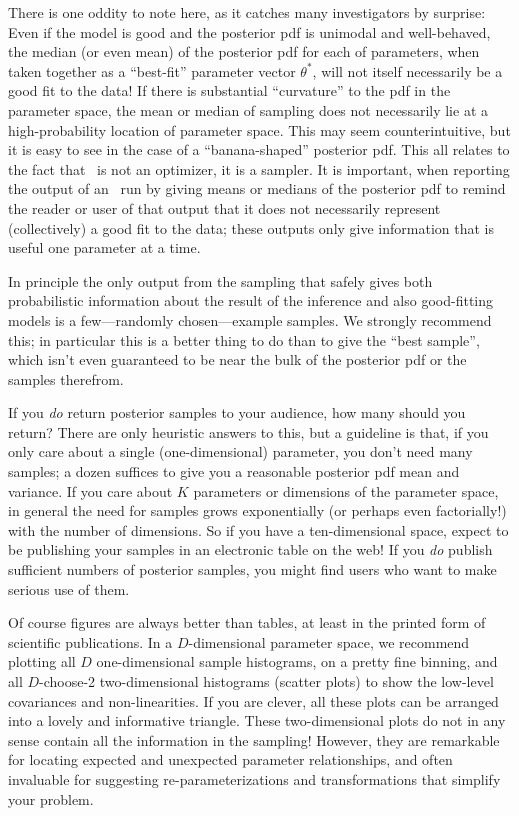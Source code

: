 \documentclass[12pt,twoside,pdftex]{article}
\newcommand{\MCMC}{\acronym{MCMC}}
\newcommand{\pars}{\theta}
\begin{document}
There is one oddity to note here, as it catches many investigators by
surprise:
Even if the model is good and the posterior pdf is unimodal and well-behaved,
the median (or even mean) of the posterior pdf for each of parameters,
when taken together as a ``best-fit'' parameter vector $\pars^\ast$,
will not itself necessarily be a good fit to the data!
If there is substantial ``curvature'' to the pdf in the parameter
space, the mean or median of sampling does not necessarily lie at a
high-probability location of parameter space.
This may seem counterintuitive, but it is easy to see in the case of a
``banana-shaped'' posterior pdf.
This all relates to the fact that \MCMC\ is not an optimizer, it is a
sampler.
It is important, when reporting the output of an \MCMC\ run by giving
means or medians of the posterior pdf to remind the reader or user of
that output that it does not necessarily represent (collectively) a
good fit to the data; these outputs only give information that is
useful one parameter at a time.

In principle the only output from the sampling that safely gives both
probabilistic information about the result of the inference and also
good-fitting models is a few---randomly chosen---example samples.
We strongly recommend this; in
particular this is a better thing to do than to give the ``best
sample'', which isn't even guaranteed to be near the bulk of the
posterior pdf or the samples therefrom.

If you \emph{do} return posterior samples to your audience, how many
should you return?
There are only heuristic answers to this, but a guideline is that, if
you only care about a single (one-dimensional) parameter, you don't
need many samples; a dozen suffices to give you a reasonable posterior
pdf mean and variance.
If you care about $K$ parameters or dimensions of the parameter space,
in general the need for samples grows exponentially (or perhaps even
factorially!) with the number of dimensions.
So if you have a ten-dimensional space, expect to be publishing your
samples in an electronic table on the web!
If you \emph{do} publish sufficient numbers of posterior samples, you
might find users who want to make serious use of them.

Of course figures are always better than tables, at least in the
printed form of scientific publications.
In a $D$-dimensional parameter space, we recommend plotting all $D$
one-dimensional sample histograms, on a pretty fine binning, and all
$D$-choose-2 two-dimensional histograms (scatter plots) to show the
low-level covariances and non-linearities.
If you are clever, all these plots can be arranged into a lovely and
informative triangle.
These two-dimensional plots do not in any sense contain all the
information in the sampling!  However, they are remarkable for
locating expected and unexpected parameter relationships, and often
invaluable for suggesting re-parameterizations and transformations
that simplify your problem.
\end{document}
